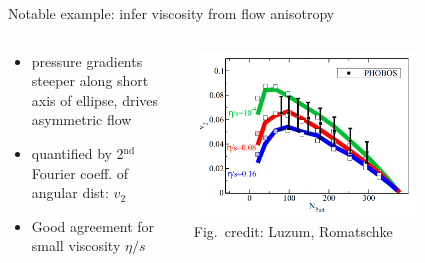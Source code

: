 \documentclass[xcolor=dvipsnames, aspectratio=169]{beamer}
\begin{document}
\begin{frame}[t, plain]{Notable example: infer viscosity from flow anisotropy}
{\begin{columns}[T]
\begin{column}{0.5\textwidth}
            \begin{itemize}
                \small
                \item pressure gradients steeper along short axis of ellipse, drives asymmetric flow\\
                \item quantified by 2$^\mathrm{nd}$ Fourier coeff. of angular dist: $v_2$\\
                \item Good agreement for small viscosity $\eta/s$
            \end{itemize}
        \end{column}
        \begin{column}{0.45\textwidth}
            \centering
            \includegraphics[width=0.75\textwidth]{v2}\\
            \scriptsize Fig.\ credit: Luzum, Romatschke
        \end{column}
        \begin{column}{0.025\textwidth}
        \end{column}
    \end{columns}}
\end{frame}
\end{document}
